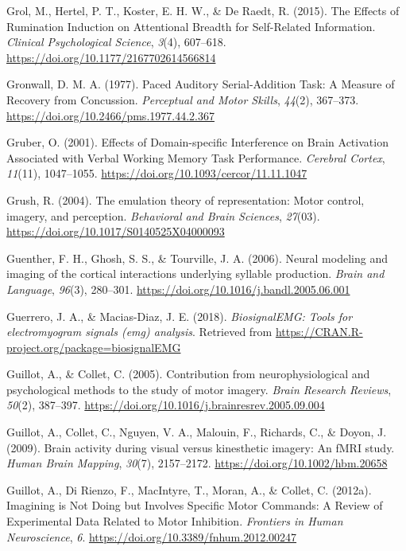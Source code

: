 \documentclass[a4paper,12pt,twoside,onecolumn,openright,final,oldfontcommands]{memoir}
\begin{document}
\leavevmode\hypertarget{ref-grol_effects_2015}{}%
Grol, M., Hertel, P. T., Koster, E. H. W., \& De Raedt, R. (2015). The Effects of Rumination Induction on Attentional Breadth for Self-Related Information. \emph{Clinical Psychological Science}, \emph{3}(4), 607--618. \url{https://doi.org/10.1177/2167702614566814}

\leavevmode\hypertarget{ref-gronwall_paced_1977}{}%
Gronwall, D. M. A. (1977). Paced Auditory Serial-Addition Task: A Measure of Recovery from Concussion. \emph{Perceptual and Motor Skills}, \emph{44}(2), 367--373. \url{https://doi.org/10.2466/pms.1977.44.2.367}

\leavevmode\hypertarget{ref-gruber_effects_2001}{}%
Gruber, O. (2001). Effects of Domain-specific Interference on Brain Activation Associated with Verbal Working Memory Task Performance. \emph{Cerebral Cortex}, \emph{11}(11), 1047--1055. \url{https://doi.org/10.1093/cercor/11.11.1047}

\leavevmode\hypertarget{ref-grush_emulation_2004}{}%
Grush, R. (2004). The emulation theory of representation: Motor control, imagery, and perception. \emph{Behavioral and Brain Sciences}, \emph{27}(03). \url{https://doi.org/10.1017/S0140525X04000093}

\leavevmode\hypertarget{ref-guenther_neural_2006}{}%
Guenther, F. H., Ghosh, S. S., \& Tourville, J. A. (2006). Neural modeling and imaging of the cortical interactions underlying syllable production. \emph{Brain and Language}, \emph{96}(3), 280--301. \url{https://doi.org/10.1016/j.bandl.2005.06.001}

\leavevmode\hypertarget{ref-R-biosignalEMG}{}%
Guerrero, J. A., \& Macias-Diaz, J. E. (2018). \emph{BiosignalEMG: Tools for electromyogram signals (emg) analysis}. Retrieved from \url{https://CRAN.R-project.org/package=biosignalEMG}

\leavevmode\hypertarget{ref-guillot_contribution_2005}{}%
Guillot, A., \& Collet, C. (2005). Contribution from neurophysiological and psychological methods to the study of motor imagery. \emph{Brain Research Reviews}, \emph{50}(2), 387--397. \url{https://doi.org/10.1016/j.brainresrev.2005.09.004}

\leavevmode\hypertarget{ref-guillot_brain_2009}{}%
Guillot, A., Collet, C., Nguyen, V. A., Malouin, F., Richards, C., \& Doyon, J. (2009). Brain activity during visual versus kinesthetic imagery: An fMRI study. \emph{Human Brain Mapping}, \emph{30}(7), 2157--2172. \url{https://doi.org/10.1002/hbm.20658}

\leavevmode\hypertarget{ref-guillot_imagining_2012}{}%
Guillot, A., Di Rienzo, F., MacIntyre, T., Moran, A., \& Collet, C. (2012a). Imagining is Not Doing but Involves Specific Motor Commands: A Review of Experimental Data Related to Motor Inhibition. \emph{Frontiers in Human Neuroscience}, \emph{6}. \url{https://doi.org/10.3389/fnhum.2012.00247}
\end{document}
